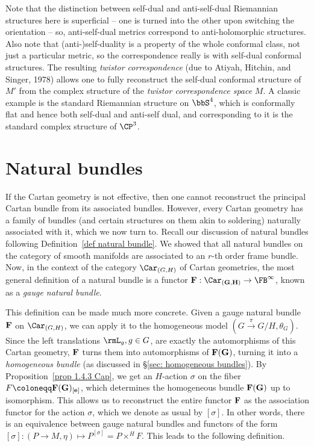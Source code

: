 \begin{example}
    Note that the distinction between self-dual and anti-self-dual Riemannian structures here is superficial -- one is turned into the other upon switching the orientation -- so, anti-self-dual metrics correspond to anti-holomorphic structures. Also note that (anti-)self-duality is a property of the whole conformal class, not just a particular metric, so the correspondence really is with self-dual conformal structures. The resulting \emph{twistor correspondence} (due to Atiyah, Hitchin, and Singer, 1978) allows one to fully reconstruct the self-dual conformal structure of $M'$ from the complex structure of the \emph{twistor correspondence space} $M$. A classic example is the standard Riemannian structure on $\bbS^4$, which is conformally flat and hence both self-dual and anti-self dual, and corresponding to it is the standard complex structure of $\CP^3$.
\end{example}






\section{Natural bundles}\label{sec: natural bundles}



If the Cartan geometry is not effective, then one cannot reconstruct the principal Cartan bundle from its associated bundles. However, every Cartan geometry has a family of bundles (and certain structures on them akin to soldering) naturally associated with it, which we now turn to. Recall our discussion of natural bundles following Definition~\ref{def natural bundle}. We showed that all natural bundles on the category of smooth manifolds are associated to an $r$-th order frame bundle. Now, in the context of the category $\Car_{(G,H)}$ of Cartan geometries, the most general definition of a natural bundle is a functor $\bf{F}:\Car_{(G,H)}\to \FB^\infty$, known as a \emph{gauge natural bundle}. 

This definition can be made much more concrete. Given a gauge natural bundle $\bf{F}$ on $\Car_{(G,H)}$, we can apply it to the homogeneous model $(G\overset{\pi}{\to} G\slash H,\theta_G)$. Since the left translations $\rmL_g,g\in G$, are exactly the automorphisms of this Cartan geometry, $\bf{F}$ turns them into automorphisms of $\bf{F}(G)$, turning it into a \emph{homogeneous bundle} (as discussed in \S\ref{sec: homogeneous bundles}). By Proposition~\ref{prop 1.4.3 Cap}, we get an $H$-action $\sigma$ on the fiber $F\coloneqq \bf{F}(G)_{[e]}$, which determines the homogeneous bundle $\bf{F}(G)$ up to isomorphism. This allows us to reconstruct the entire functor $\bf{F}$ as the association functor for the action $\sigma$, which we denote as usual by $[\sigma]$. In other words, there is an equivalence between gauge natural bundles and functors of the form $[\sigma]:(P\to M,\eta)\mapsto P^{[\sigma]}=P\times^H F$. This leads to the following definition.

